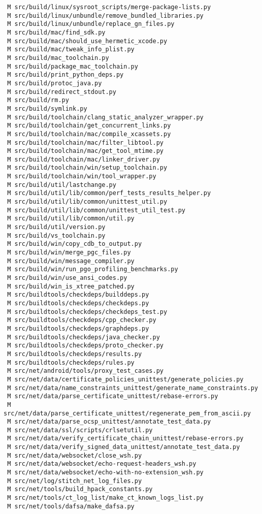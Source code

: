 \documentclass{article}
\begin{document}
\begin{verbatim}
 M src/build/linux/sysroot_scripts/merge-package-lists.py
 M src/build/linux/unbundle/remove_bundled_libraries.py
 M src/build/linux/unbundle/replace_gn_files.py
 M src/build/mac/find_sdk.py
 M src/build/mac/should_use_hermetic_xcode.py
 M src/build/mac/tweak_info_plist.py
 M src/build/mac_toolchain.py
 M src/build/package_mac_toolchain.py
 M src/build/print_python_deps.py
 M src/build/protoc_java.py
 M src/build/redirect_stdout.py
 M src/build/rm.py
 M src/build/symlink.py
 M src/build/toolchain/clang_static_analyzer_wrapper.py
 M src/build/toolchain/get_concurrent_links.py
 M src/build/toolchain/mac/compile_xcassets.py
 M src/build/toolchain/mac/filter_libtool.py
 M src/build/toolchain/mac/get_tool_mtime.py
 M src/build/toolchain/mac/linker_driver.py
 M src/build/toolchain/win/setup_toolchain.py
 M src/build/toolchain/win/tool_wrapper.py
 M src/build/util/lastchange.py
 M src/build/util/lib/common/perf_tests_results_helper.py
 M src/build/util/lib/common/unittest_util.py
 M src/build/util/lib/common/unittest_util_test.py
 M src/build/util/lib/common/util.py
 M src/build/util/version.py
 M src/build/vs_toolchain.py
 M src/build/win/copy_cdb_to_output.py
 M src/build/win/merge_pgc_files.py
 M src/build/win/message_compiler.py
 M src/build/win/run_pgo_profiling_benchmarks.py
 M src/build/win/use_ansi_codes.py
 M src/build/win_is_xtree_patched.py
 M src/buildtools/checkdeps/builddeps.py
 M src/buildtools/checkdeps/checkdeps.py
 M src/buildtools/checkdeps/checkdeps_test.py
 M src/buildtools/checkdeps/cpp_checker.py
 M src/buildtools/checkdeps/graphdeps.py
 M src/buildtools/checkdeps/java_checker.py
 M src/buildtools/checkdeps/proto_checker.py
 M src/buildtools/checkdeps/results.py
 M src/buildtools/checkdeps/rules.py
 M src/net/android/tools/proxy_test_cases.py
 M src/net/data/certificate_policies_unittest/generate_policies.py
 M src/net/data/name_constraints_unittest/generate_name_constraints.py
 M src/net/data/parse_certificate_unittest/rebase-errors.py
 M src/net/data/parse_certificate_unittest/regenerate_pem_from_ascii.py
 M src/net/data/parse_ocsp_unittest/annotate_test_data.py
 M src/net/data/ssl/scripts/crlsetutil.py
 M src/net/data/verify_certificate_chain_unittest/rebase-errors.py
 M src/net/data/verify_signed_data_unittest/annotate_test_data.py
 M src/net/data/websocket/close_wsh.py
 M src/net/data/websocket/echo-request-headers_wsh.py
 M src/net/data/websocket/echo-with-no-extension_wsh.py
 M src/net/log/stitch_net_log_files.py
 M src/net/tools/build_hpack_constants.py
 M src/net/tools/ct_log_list/make_ct_known_logs_list.py
 M src/net/tools/dafsa/make_dafsa.py

\end{verbatim}
\end{document}
